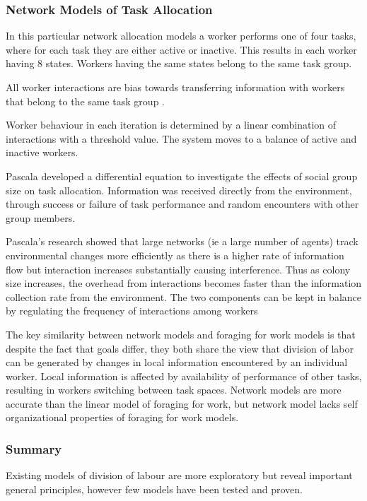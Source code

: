 \subsubsection{Network Models of Task Allocation}
In this particular network allocation models a worker performs one of four tasks, where for each task they are either active or inactive. This results in each worker having 8 states. Workers having the same states belong to the same task group.

All worker interactions are bias towards transferring information with workers that belong to the same task group \cite{gordon1992parallel}.

Worker behaviour in each iteration is determined by a linear combination of interactions with a threshold value. The system moves to a balance of active and inactive workers. 

Pascala \cite{pacala1996effects} developed a differential equation to investigate the effects of social group size on task allocation. Information was received directly from the environment, through success or failure of task performance and random encounters with other group members.

Pascala's research showed that large networks (ie a large number of agents) track environmental changes more efficiently as there is a higher rate of information flow but interaction increases substantially causing interference. Thus as colony size increases, the overhead from interactions becomes faster than the information collection rate from the environment. The two components can be kept in balance by regulating the frequency of interactions among workers \cite{pacala1996effects} %

The key similarity between network models and foraging for work models is that despite the fact that goals differ, they both share the view that division of labor can be generated by changes in local information encountered by an individual worker. Local information is affected by availability of performance of other tasks, resulting in workers switching between task spaces. Network models are more accurate than the linear model of foraging for work, but network model lacks self organizational properties of foraging for work models.

\subsubsection{Summary} 
Existing models of division of labour are more exploratory but reveal important general principles, however few models have been tested and proven.

